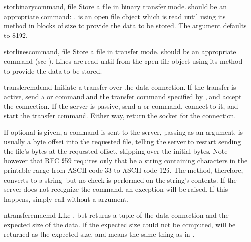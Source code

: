 \begin{methoddesc}[FTP]{storbinary}{command, file}
Store a file in binary transfer mode.   should be an
appropriate  command: .
 is an open file object which is read until \EOF{} using its
 method in blocks of size  to provide the
data to be stored.  The  argument defaults to 8192.
\end{methoddesc}

\begin{methoddesc}[FTP]{storlines}{command, file}
Store a file in \ASCII{} transfer mode.   should be an
appropriate  command (see ).  Lines are
read until \EOF{} from the open file object  using its
 method to provide the data to be stored.
\end{methoddesc}

\begin{methoddesc}[FTP]{transfercmd}{cmd}
Initiate a transfer over the data connection.  If the transfer is
active, send a  or   command and the transfer command specified
by , and accept the connection.  If the server is passive,
send a  or  command, connect to it, and start the transfer
command.  Either way, return the socket for the connection.

If optional  is given, a  command is
sent to the server, passing  as an argument.   is
usually a byte offset into the requested file, telling the server to
restart sending the file's bytes at the requested offset, skipping
over the initial bytes.  Note however that RFC
959 requires only that  be a string containing characters
in the printable range from ASCII code 33 to ASCII code 126.  The
 method, therefore, converts
 to a string, but no check is
performed on the string's contents.  If the server does
not recognize the  command, an
 exception will be raised.  If this happens,
simply call  without a  argument.
\end{methoddesc}

\begin{methoddesc}[FTP]{ntransfercmd}{cmd}
Like , but returns a tuple of the data
connection and the expected size of the data.  If the expected size
could not be computed,  will be returned as the expected
size.   and  means the same thing as in
.
\end{methoddesc}

